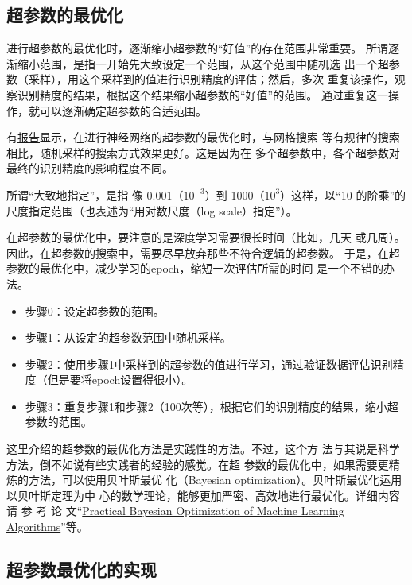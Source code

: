 \subsection{超参数的最优化}
进行超参数的最优化时，逐渐缩小超参数的“好值”的存在范围非常重要。
所谓逐渐缩小范围，是指一开始先大致设定一个范围，从这个范围中随机选
出一个超参数（采样），用这个采样到的值进行识别精度的评估；然后，多次
重复该操作，观察识别精度的结果，根据这个结果缩小超参数的“好值”的范围。
通过重复这一操作，就可以逐渐确定超参数的合适范围。
\begin{tcolorbox}
    有\href{https://www.jmlr.org/papers/volume13/bergstra12a/bergstra12a.pdf}{报告}显示，在进行神经网络的超参数的最优化时，与网格搜索
    等有规律的搜索相比，随机采样的搜索方式效果更好。这是因为在
    多个超参数中，各个超参数对最终的识别精度的影响程度不同。
\end{tcolorbox}

所谓“大致地指定”，是指
像 0.001（$10^{-3}$）到 1000（$10^3$）这样，以“10 的阶乘”的尺度指定范围（也表述为“用对数尺度（log scale）指定”）。

在超参数的最优化中，要注意的是深度学习需要很长时间（比如，几天
或几周）。因此，在超参数的搜索中，需要尽早放弃那些不符合逻辑的超参数。
于是，在超参数的最优化中，减少学习的epoch，缩短一次评估所需的时间
是一个不错的办法。
\begin{itemize}
    \item 步骤0：设定超参数的范围。
    \item 步骤1：从设定的超参数范围中随机采样。
    \item 步骤2：使用步骤1中采样到的超参数的值进行学习，通过验证数据评估识别精
          度（但是要将epoch设置得很小）。
    \item 步骤3：重复步骤1和步骤2（100次等），根据它们的识别精度的结果，缩小超参数的范围。
\end{itemize}

\begin{tcolorbox}
    这里介绍的超参数的最优化方法是实践性的方法。不过，这个方
    法与其说是科学方法，倒不如说有些实践者的经验的感觉。在超
    参数的最优化中，如果需要更精炼的方法，可以使用贝叶斯最优
    化（Bayesian optimization）。贝叶斯最优化运用以贝叶斯定理为中
    心的数学理论，能够更加严密、高效地进行最优化。详细内容请
    参 考 论 文“\href{https://arxiv.org/abs/1206.2944}{Practical Bayesian Optimization of Machine Learning Algorithms}”等。
\end{tcolorbox}
\subsection{超参数最优化的实现}




